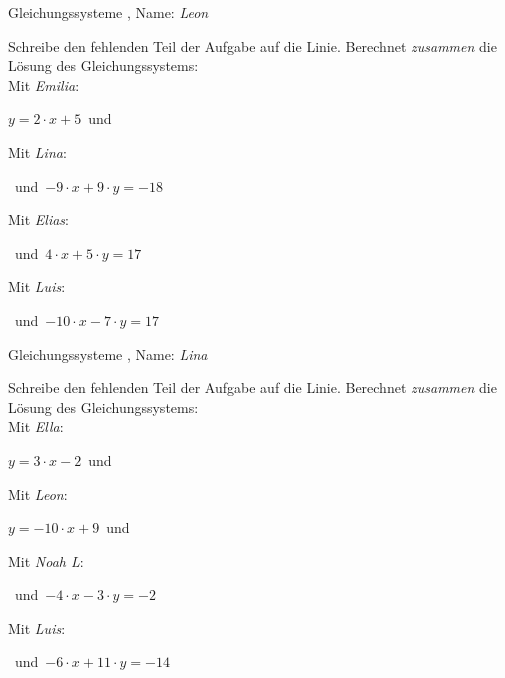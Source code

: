 \newpage
\begin{center}\large Gleichungssysteme
, Name: \emph{Leon}\end{center}
Schreibe den fehlenden Teil der Aufgabe auf die Linie. Berechnet \emph{zusammen} die Lösung des Gleichungssystems:
\\
\vfill Mit \emph{Emilia}:
\begin{center}$y=2\cdot x+5$\mbox{ }und\mbox{ }\underline{}
\end{center}
\vfill Mit \emph{Lina}:
\begin{center}\underline{}
\mbox{ }und\mbox{ }$-9\cdot x+9\cdot y=-18$\end{center}
\vfill Mit \emph{Elias}:
\begin{center}\underline{}
\mbox{ }und\mbox{ }$4\cdot x+5\cdot y=17$\end{center}
\vfill Mit \emph{Luis}:
\begin{center}\underline{}
\mbox{ }und\mbox{ }$-10\cdot x-7\cdot y=17$\end{center}
\newpage
\begin{center}\large Gleichungssysteme
, Name: \emph{Lina}\end{center}
Schreibe den fehlenden Teil der Aufgabe auf die Linie. Berechnet \emph{zusammen} die Lösung des Gleichungssystems:
\\
\vfill Mit \emph{Ella}:
\begin{center}$y=3\cdot x-2$\mbox{ }und\mbox{ }\underline{}
\end{center}
\vfill Mit \emph{Leon}:
\begin{center}$y=-10\cdot x+9$\mbox{ }und\mbox{ }\underline{}
\end{center}
\vfill Mit \emph{Noah L}:
\begin{center}\underline{}
\mbox{ }und\mbox{ }$-4\cdot x-3\cdot y=-2$\end{center}
\vfill Mit \emph{Luis}:
\begin{center}\underline{}
\mbox{ }und\mbox{ }$-6\cdot x+11\cdot y=-14$\end{center}
